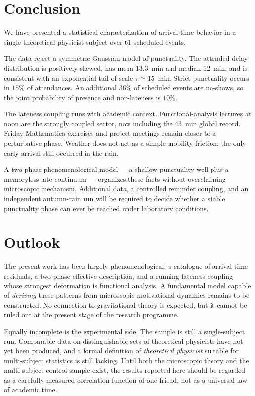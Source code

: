 \documentclass[10pt,twocolumn]{article}
\begin{document}
\section{Conclusion}

We have presented a statistical characterization of
arrival-time behavior in a single theoretical-physicist
subject over 61 scheduled events.

The data reject a symmetric Gaussian model of punctuality.
The attended delay distribution is positively skewed, has
mean $13.3$~min and median $12$~min, and is consistent
with an exponential tail of scale $\tau\simeq 15$~min.
Strict punctuality occurs in $15\%$ of attendances.
An additional $36\%$ of scheduled events are no-shows,
so the joint probability of presence and non-lateness is
$10\%$.

The lateness coupling runs with academic context.
Functional-analysis lectures at noon are the strongly
coupled sector, now including the $43$~min global record.
Friday Mathematica exercises and project meetings remain
closer to a perturbative phase.
Weather does not act as a simple mobility friction;
the only early arrival still occurred in the rain.

A two-phase phenomenological model --- a shallow
punctuality well plus a memoryless late continuum ---
organizes these facts without overclaiming
microscopic mechanism. Additional data, a controlled
reminder coupling, and an independent autumn-rain run
will be required to decide whether a stable punctuality
phase can ever be reached under laboratory conditions.

\section{Outlook}

The present work has been largely phenomenological: a catalogue of
arrival-time residuals, a two-phase effective description, and a
running lateness coupling whose strongest deformation is functional
analysis. A fundamental model capable of \emph{deriving} these
patterns from microscopic motivational dynamics remains to be
constructed. No connection to gravitational theory is expected, but
it cannot be ruled out at the present stage of the research programme.

Equally incomplete is the experimental side. The sample is still a
single-subject run. Comparable data on distinguishable sets of
theoretical physicists have not yet been produced, and a formal
definition of \textit{theoretical physicist} suitable for multi-subject
statistics is still lacking. Until both the microscopic theory and
the multi-subject control sample exist, the results reported here
should be regarded as a carefully measured correlation function of
one friend, not as a universal law of academic time.
\end{document}
